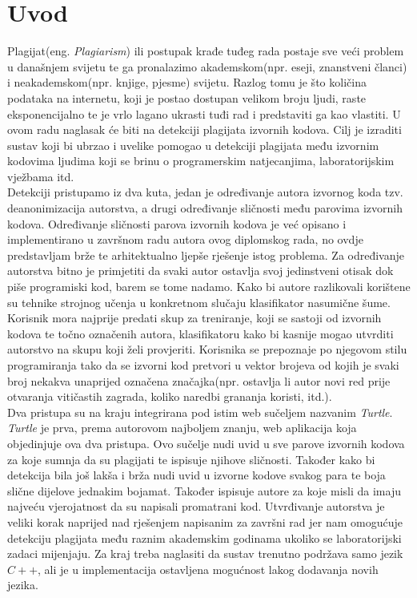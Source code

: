 \chapter*{Uvod}

	Plagijat(eng. \textit{Plagiarism}) ili postupak krađe tuđeg rada postaje sve veći problem u današnjem svijetu te ga pronalazimo akademskom(npr. eseji, znanstveni članci) i neakademskom(npr. knjige, pjesme) svijetu. Razlog tomu je što količina podataka na internetu, koji je postao dostupan velikom broju ljudi, raste eksponencijalno te je vrlo lagano ukrasti tuđi rad i predstaviti ga kao vlastiti. U ovom radu naglasak će biti na detekciji plagijata izvornih kodova. Cilj je izraditi sustav koji bi ubrzao i uvelike pomogao u detekciji plagijata među izvornim kodovima ljudima koji se brinu o programerskim natjecanjima, laboratorijskim vježbama itd. \\

	Detekciji pristupamo iz dva kuta, jedan je određivanje autora izvornog koda tzv. deanonimizacija autorstva, a drugi određivanje sličnosti među parovima izvornih kodova.   Određivanje sličnosti parova izvornih kodova je već opisano i implementirano u završnom radu autora ovog diplomskog rada, no ovdje predstavljam brže te arhitektualno ljepše rješenje istog problema. Za određivanje autorstva bitno je primjetiti da svaki autor ostavlja svoj jedinstveni otisak dok piše programiski kod, barem se tome nadamo. Kako bi autore razlikovali korištene su tehnike strojnog učenja u konkretnom slučaju klasifikator nasumične šume. Korisnik mora najprije predati skup za treniranje, koji se sastoji od izvornih kodova te točno označenih autora, klasifikatoru kako bi kasnije mogao utvrditi autorstvo na skupu koji želi provjeriti. Korisnika se prepoznaje po njegovom stilu programiranja tako da se izvorni kod pretvori u vektor brojeva od kojih je svaki broj nekakva unaprijed označena značajka(npr. ostavlja li autor novi red prije otvaranja vitičastih zagrada, koliko naredbi grananja koristi, itd.). \\

	Dva pristupa su na kraju integrirana pod istim web sučeljem nazvanim \textit{Turtle}.  \textit{Turtle} je prva, prema autorovom najboljem znanju, web aplikacija koja objedinjuje ova dva pristupa. Ovo sučelje nudi uvid u sve parove izvornih kodova za koje sumnja da su plagijati te ispisuje njihove sličnosti. Također kako bi detekcija bila još lakša i brža nudi uvid u izvorne kodove svakog para te boja slične dijelove jednakim bojamat. Također ispisuje autore za koje misli da imaju najveću vjerojatnost da su napisali promatrani kod. Utvrđivanje autorstva je veliki korak naprijed nad rješenjem napisanim za završni rad jer nam omogućuje detekciju plagijata među raznim akademskim godinama ukoliko se laboratorijski zadaci mijenjaju. Za kraj treba naglasiti da sustav trenutno podržava samo jezik $C++$, ali je u implementacija ostavljena mogućnost lakog dodavanja novih jezika.

